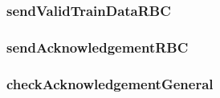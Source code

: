 \subsubsection{sendValidTrainDataRBC}


\subsubsection{sendAcknowledgementRBC}


\subsubsection{checkAcknowledgementGeneral}




